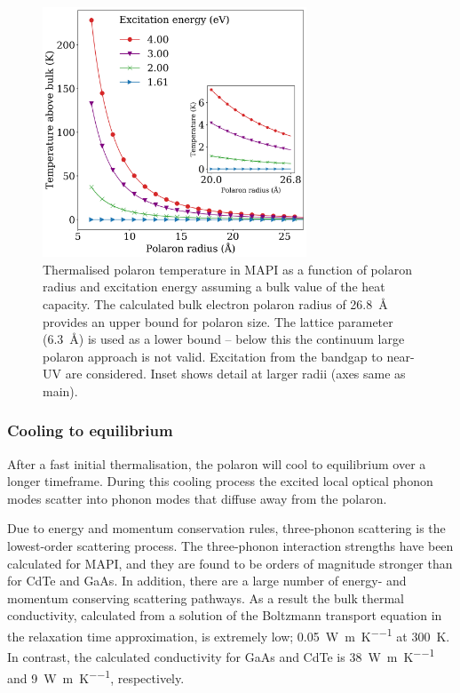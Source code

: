 \begin{table}
\begin{figure}[h]
\centering
  \includegraphics[width=0.7\textwidth]{figures/ch5/f3.png}
  \caption[Polaron temperature as a function of polaron radius]{Thermalised polaron temperature in MAPI as a function of polaron
    radius and excitation  energy assuming a bulk value of the heat capacity. 
    The calculated bulk electron polaron radius
    of \SI{26.8}{\angstrom} provides an upper bound for polaron size.
    The lattice parameter (\SI{6.3}{\angstrom}) is used as a lower bound -- below this the
    continuum large polaron approach is not valid. 
    Excitation from the bandgap to near-UV are considered. 
    Inset shows detail at larger radii (axes same as main). }
  \label{ch5TemperatureRadius}
\end{figure}


\subsubsection{Cooling to equilibrium}
After a fast initial thermalisation, the polaron will cool to equilibrium over a longer timeframe. During this cooling process the excited local optical phonon modes scatter into phonon modes that diffuse away from the polaron.

Due to energy and momentum conservation rules, three-phonon scattering is the lowest-order scattering process.  The three-phonon interaction strengths have been calculated for MAPI,\autocite{Whalley2016} and they are found to be orders of magnitude stronger than for CdTe and GaAs. In addition, there are a large number of energy- and momentum conserving scattering pathways. As a result the bulk thermal conductivity, calculated from a solution of the Boltzmann transport equation in the relaxation time approximation, is extremely low; \SI{0.05}{\watt\per\metre\per\K} at \SI{300}{\K}.\autocite{Whalley2016} 
In contrast, the calculated conductivity for GaAs and CdTe is 
\SI{38}{\watt\per\metre\per\K}
and
\SI{9}{\watt\per\metre\per\K},
respectively.


\end{table}
